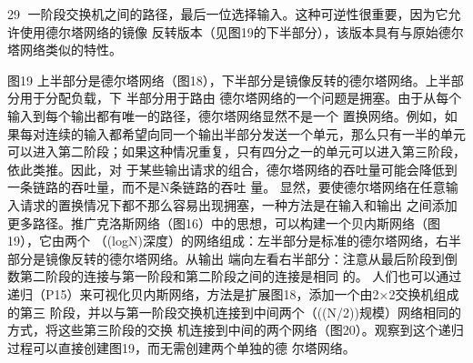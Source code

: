                                                          29
一阶段交换机之间的路径，最后一位选择输入。这种可逆性很重要，因为它允许使用德尔塔网络的镜像
反转版本（见图19的下半部分），该版本具有与原始德尔塔网络类似的特性。




图19 上半部分是德尔塔网络（图18），下半部分是镜像反转的德尔塔网络。上半部分用于分配负载，下
半部分用于路由
德尔塔网络的一个问题是拥塞。由于从每个输入到每个输出都有唯一的路径，德尔塔网络显然不是一个
置换网络。例如，如果每对连续的输入都希望向同一个输出半部分发送一个单元，那么只有一半的单元
可以进入第二阶段；如果这种情况重复，只有四分之一的单元可以进入第三阶段，依此类推。因此，对
于某些输出请求的组合，德尔塔网络的吞吐量可能会降低到一条链路的吞吐量，而不是N条链路的吞吐
量。
显然，要使德尔塔网络在任意输入请求的置换情况下都不那么容易出现拥塞，一种方法是在输入和输出
之间添加更多路径。推广克洛斯网络（图16）中的思想，可以构建一个贝内斯网络（图19），它由两个
（(logN)深度）的网络组成：左半部分是标准的德尔塔网络，右半部分是镜像反转的德尔塔网络。从输出
端向左看右半部分：注意从最后阶段到倒数第二阶段的连接与第一阶段和第二阶段之间的连接是相同
的。
人们也可以通过递归（P15）来可视化贝内斯网络，方法是扩展图18，添加一个由2×2交换机组成的第三
阶段，并以与第一阶段交换机连接到中间两个（((N/2))规模）网络相同的方式，将这些第三阶段的交换
机连接到中间的两个网络（图20）。观察到这个递归过程可以直接创建图19，而无需创建两个单独的德
尔塔网络。




